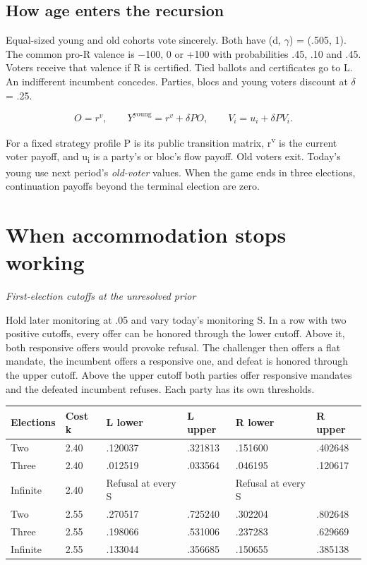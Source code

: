 \documentclass[11pt]{article}
\begin{document}
\subsection*{How age enters the recursion}

Equal-sized young and old cohorts vote sincerely. Both have (d, $\gamma$) = (.505, 1). The common pro-R valence is $-$100, 0 or +100 with probabilities .45, .10 and .45. Voters receive that valence if R is certified. Tied ballots and certificates go to L. An indifferent incumbent concedes. Parties, blocs and young voters discount at $\delta$ = .25.

\[O=r^v,\qquad Y^{\mathrm{young}}=r^v+\delta P O,\qquad V_i=u_i+\delta P V_i.\]

For a fixed strategy profile P is its public transition matrix, r\textsuperscript{v} is the current voter payoff, and u\textsubscript{i} is a party's or bloc's flow payoff. Old voters exit. Today's young use next period's \emph{old-voter} values. When the game ends in three elections, continuation payoffs beyond the terminal election are zero.

\section*{When accommodation stops working}
\emph{First-election cutoffs at the unresolved prior}

Hold later monitoring at .05 and vary today's monitoring S. In a row with two positive cutoffs, every offer can be honored through the lower cutoff. Above it, both responsive offers would provoke refusal. The challenger then offers a flat mandate, the incumbent offers a responsive one, and defeat is honored through the upper cutoff. Above the upper cutoff both parties offer responsive mandates and the defeated incumbent refuses. Each party has its own thresholds.

\begin{center}\small\begin{tabular}{llllll}\toprule
\textbf{Elections} & \textbf{Cost k} & \textbf{L lower} & \textbf{L upper} & \textbf{R lower} & \textbf{R upper}\\ \midrule
Two & 2.40 & .120037 & .321813 & .151600 & .402648\\
Three & 2.40 & .012519 & .033564 & .046195 & .120617\\
Infinite & 2.40 & Refusal at every S &  & Refusal at every S & \\
Two & 2.55 & .270517 & .725240 & .302204 & .802648\\
Three & 2.55 & .198066 & .531006 & .237283 & .629669\\
Infinite & 2.55 & .133044 & .356685 & .150655 & .385138\\
\bottomrule\end{tabular}\end{center}
\end{document}
